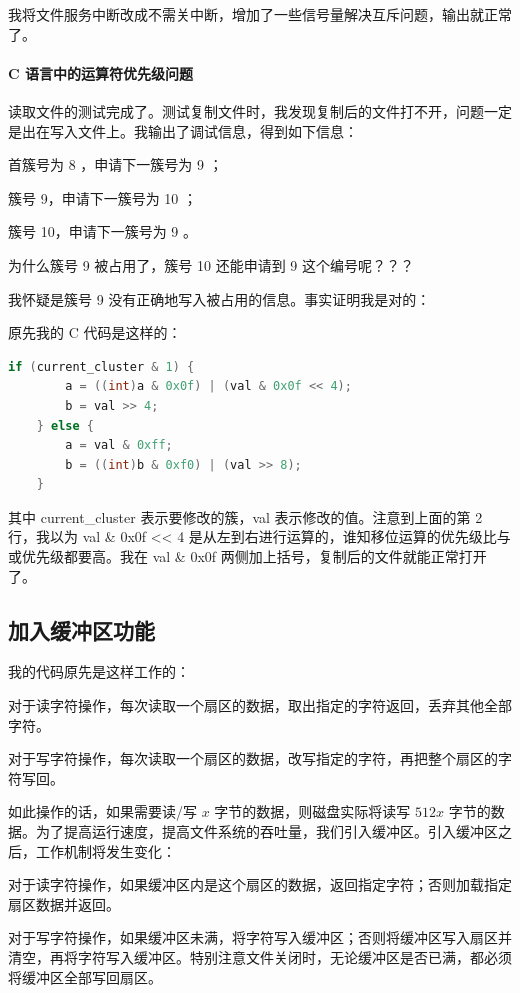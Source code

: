 \documentclass[a4paper]{article}
\begin{document}
我将文件服务中断改成不需关中断，增加了一些信号量解决互斥问题，输出就正常了。

\paragraph{C 语言中的运算符优先级问题}

读取文件的测试完成了。测试复制文件时，我发现复制后的文件打不开，问题一定是出在写入文件上。我输出了调试信息，得到如下信息：

首簇号为 8 ，申请下一簇号为 9 ；

簇号 9，申请下一簇号为 10 ；

簇号 10，申请下一簇号为 9 。

为什么簇号 9 被占用了，簇号 10 还能申请到 9 这个编号呢？？？

我怀疑是簇号 9 没有正确地写入被占用的信息。事实证明我是对的：

原先我的 C 代码是这样的：

\begin{lstlisting}[language=C]
	if (current_cluster & 1) {
		a = ((int)a & 0x0f) | (val & 0x0f << 4);
		b = val >> 4;
	} else {
		a = val & 0xff;
		b = ((int)b & 0xf0) | (val >> 8);
	}
\end{lstlisting}

其中 current\_cluster 表示要修改的簇，val 表示修改的值。注意到上面的第 2 行，我以为 val \& 0x0f << 4 是从左到右进行运算的，谁知移位运算的优先级比与或优先级都要高。我在 val \& 0x0f 两侧加上括号，复制后的文件就能正常打开了。

\subsection{加入缓冲区功能}

我的代码原先是这样工作的：

对于读字符操作，每次读取一个扇区的数据，取出指定的字符返回，丢弃其他全部字符。

对于写字符操作，每次读取一个扇区的数据，改写指定的字符，再把整个扇区的字符写回。

如此操作的话，如果需要读/写 $x$ 字节的数据，则磁盘实际将读写 $512x$ 字节的数据。为了提高运行速度，提高文件系统的吞吐量，我们引入缓冲区。引入缓冲区之后，工作机制将发生变化：

对于读字符操作，如果缓冲区内是这个扇区的数据，返回指定字符；否则加载指定扇区数据并返回。

对于写字符操作，如果缓冲区未满，将字符写入缓冲区；否则将缓冲区写入扇区并清空，再将字符写入缓冲区。特别注意文件关闭时，无论缓冲区是否已满，都必须将缓冲区全部写回扇区。
\end{document}
